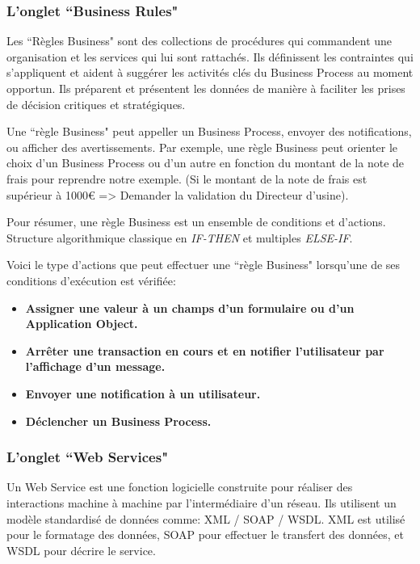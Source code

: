 \subsubsection{L'onglet ``Business Rules"}

Les ``Règles Business" sont des collections de procédures qui commandent une organisation et les services qui lui sont rattachés. Ils définissent les contraintes qui s'appliquent et aident à suggérer les activités clés du Business Process au moment opportun. Ils préparent et présentent les données de manière à faciliter les prises de décision critiques et stratégiques. 

Une ``règle Business" peut appeller un Business Process, envoyer des notifications, ou afficher des avertissements. Par exemple, une règle Business peut orienter le choix d'un Business Process ou d'un autre en fonction du montant de la note de frais pour reprendre notre exemple. (Si le montant de la note de frais est supérieur à 1000€ => Demander la validation du Directeur d'usine). 

Pour résumer, une règle Business est un ensemble de conditions et d'actions. Structure algorithmique classique en \emph{IF-THEN } et multiples \emph{ELSE-IF}.


Voici le type d'actions que peut effectuer une ``règle Business" lorsqu'une de ses conditions d'exécution est vérifiée:

\begin{itemize}\itemsep7pt
	 \item \textbf{Assigner une valeur à un champs d'un formulaire ou d'un Application Object.}
	 	 
	 \item \textbf{Arrêter une transaction en cours et en notifier l'utilisateur par l'affichage d'un message.}
	 
	 \item \textbf{Envoyer une notification à un utilisateur.}
	 
	 \item \textbf{Déclencher un Business Process.} 
\end{itemize}

\subsubsection{L'onglet ``Web Services"}

Un Web Service  est une fonction logicielle construite pour réaliser des interactions machine à machine par l'intermédiaire d'un réseau. Ils utilisent un modèle standardisé de données comme: XML / SOAP / WSDL. XML est utilisé pour le formatage des données, SOAP pour effectuer le transfert des données, et WSDL pour décrire le service.

